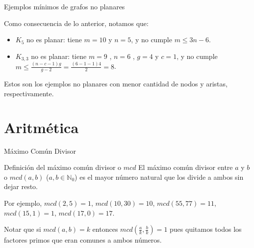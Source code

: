 \documentclass[compress]{beamer}
\begin{document}
\begin{frame}{Ejemplos mínimos de grafos no planares}

Como consecuencia de lo anterior, notamos que:

\begin{itemize}
    \item $K_5$ no es planar: tiene $m=10$ y $n=5$, y no cumple $m \leq 3n-6$.
    \item $K_{3,3}$ no es planar: tiene $m=9$ , $n=6$ , $g=4$ y $c=1$, y no cumple $m \leq \frac{(n-c-1)g}{g-2} = \frac{(6-1-1)4}{2} = 8$.
\end{itemize}

Estos son los ejemplos no planares con menor cantidad de nodos y aristas, respectivamente.

\end{frame}

\section{Aritmética}
\begin{frame}{M\'aximo Com\'un Divisor}
\begin{block}{Definici\'on del m\'aximo com\'un divisor o $mcd$}
El m\'aximo com\'un divisor entre $a$ y $b$ o $mcd(a,b)$ ($a, b \in \mathbb{N}_0$) es el mayor n\'umero natural que los divide a ambos sin dejar resto. 
\end{block}  

Por ejemplo, $mcd(2,5) = 1$, $mcd(10,30) = 10$, $mcd(55,77) = 11$, $mcd(15,1) = 1$, $mcd(17,0) = 17$. \\
\bigskip

Notar que si $mcd(a,b) = k$ entonces $mcd(\frac{a}{k}, \frac{b}{k}) = 1$ pues quitamos todos los factores primos que eran comunes a ambos n\'umeros.

\end{frame}
\end{document}
